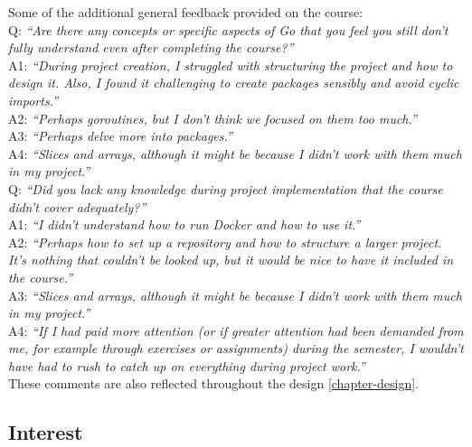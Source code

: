 \documentclass[
  digital,
  color,
  oneside,
  nosansbold,
  nocolorbold,
  lof,
  nolot,
]{fithesis4}
\begin{document}
\noindent
Some of the additional general feedback provided on the course: \\

\noindent
Q: \textit{\enquote{Are there any concepts or specific aspects of Go that you feel you still don't fully understand even after completing the course?}} \\

\noindent
A1: \textit{\enquote{During project creation, I struggled with structuring the project and how to design it. Also, I found it challenging to create packages sensibly and avoid cyclic imports.}} \\

\noindent
A2: \textit{\enquote{Perhaps goroutines, but I don't think we focused on them too much.}} \\

\noindent
A3: \textit{\enquote{Perhaps delve more into packages.}} \\

\noindent
A4: \textit{\enquote{Slices and arrays, although it might be because I didn't work with them much in my project.}} \\

\noindent
Q: \textit{\enquote{Did you lack any knowledge during project implementation that the course didn't cover adequately?}} \\

\noindent
A1: \textit{\enquote{I didn't understand how to run Docker and how to use it.}} \\

\noindent
A2: \textit{\enquote{Perhaps how to set up a repository and how to structure a larger project. It's nothing that couldn't be looked up, but it would be nice to have it included in the course.}} \\

\noindent
A3: \textit{\enquote{Slices and arrays, although it might be because I didn't work with them much in my project.}} \\

\noindent
A4: \textit{\enquote{If I had paid more attention (or if greater attention had been demanded from me, for example through exercises or assignments) during the semester, I wouldn't have had to rush to catch up on everything during project work.}} \\

\noindent
These comments are also reflected throughout the design \cref{chapter-design}.

\subsection{Interest}
\end{document}
